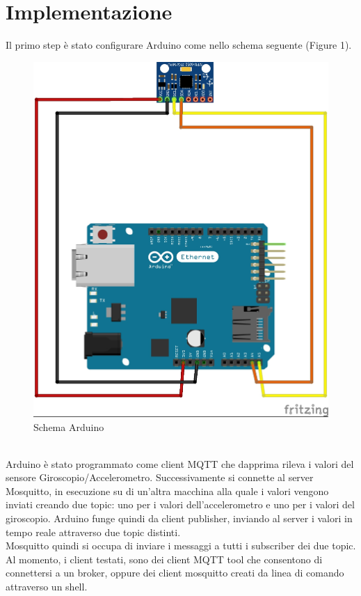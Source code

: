 \documentclass[]{scrartcl}
\begin{document}
\section{Implementazione}
Il primo step è stato configurare Arduino come nello schema seguente (Figure 1).
\begin{figure}[h]
	\centering
	\includegraphics[scale=0.7]{fritzing_bb.jpg}
	\caption{Schema Arduino}
\end{figure}
\\
Arduino è stato programmato come client MQTT che dapprima rileva i valori del sensore Giroscopio/Accelerometro. Successivamente si connette al server Mosquitto, in esecuzione su di un'altra macchina alla quale i valori vengono inviati creando due topic: uno per i valori dell'accelerometro e uno per i valori del giroscopio.
Arduino funge quindi da client publisher, inviando al server i valori in tempo reale attraverso due topic distinti.
\\
Mosquitto quindi si occupa di inviare i messaggi a tutti i subscriber dei due topic.
Al momento, i client testati, sono dei client MQTT tool che consentono di connettersi a un broker, oppure dei client mosquitto creati da linea di comando attraverso un shell.
\end{document}
